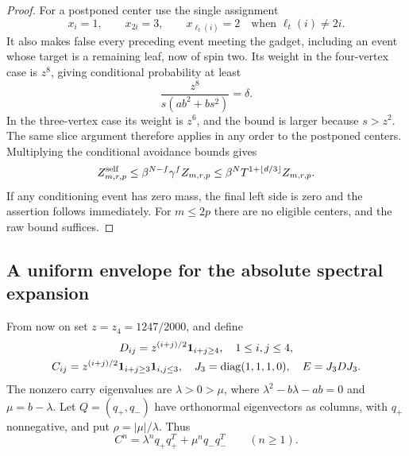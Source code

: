 \documentclass[11pt]{amsart}
\theoremstyle{definition}
\theoremstyle{remark}
\numberwithin{equation}{section}
\begin{document}
\begin{proof}
For a postponed center use the single assignment
\[
 x_i=1,\qquad x_{2i}=3,\qquad
 x_{\ell_t(i)}=2\quad\text{when }\ell_t(i)\ne2i.
\]
It also makes false every preceding event meeting the gadget, including
an event whose target is a remaining leaf, now of spin two.
Its weight in the four-vertex case is $z^8$, giving conditional
probability at least
\[
 \frac{z^8}{s(ab^2+bs^2)}=\delta.
\]
In the three-vertex case its weight is $z^6$, and the bound is larger
because $s>z^2$. The same slice argument therefore applies in any order
to the postponed centers. Multiplying the conditional avoidance bounds
gives
\[
 Z^{\rm self}_{m,r,p}\le\beta^{N-f}\gamma^f Z_{m,r,p}
 \le\beta^N T^{1+\lfloor d/3\rfloor}Z_{m,r,p}.
\]
If any conditioning event has zero mass, the final left side is zero
and the assertion follows immediately. For $m\le2p$ there are no
eligible centers, and the raw bound suffices.
\end{proof}

\subsection{A uniform envelope for the absolute spectral expansion}

From now on set $z=z_4=1247/2000$, and define
\begin{gather*}
 D_{ij}=z^{(i+j)/2}{\bf1}_{i+j\ge4},\quad 1\le i,j\le4,\\
 C_{ij}=z^{(i+j)/2}{\bf1}_{i+j\ge3}{\bf1}_{i,j\le3},\quad
 J_3=\operatorname{diag}(1,1,1,0),\quad E=J_3DJ_3.
\end{gather*}
The nonzero carry eigenvalues are $\lambda>0>\mu$, where
$\lambda^2-b\lambda-ab=0$ and $\mu=b-\lambda$.
Let $Q=(q_+,q_-)$ have orthonormal eigenvectors as columns, with
$q_+$ nonnegative, and put $\rho=|\mu|/\lambda$. Thus
\[
 C^n=\lambda^nq_+q_+^T+\mu^nq_-q_-^T\qquad(n\ge1).
\]
\end{document}
